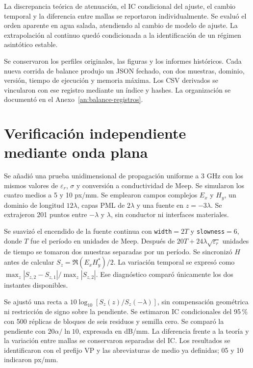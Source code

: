 La discrepancia teórica de atenuación, el IC condicional del ajuste, el cambio temporal y la diferencia entre mallas se reportaron individualmente. Se evaluó el orden aparente en agua salada, atendiendo al cambio de modelo de ajuste. La extrapolación al continuo quedó condicionada a la identificación de un régimen asintótico estable.

Se conservaron los perfiles originales, las figuras y los informes históricos. Cada nueva corrida de balance produjo un JSON fechado, con dos muestras, dominio, versión, tiempo de ejecución y memoria máxima. Los CSV derivados se vincularon con ese registro mediante un índice y hashes. La organización se documentó en el Anexo~\ref{an:balance-registros}.


\section{Verificación independiente mediante onda plana}\label{sec:metodo-planar}
Se añadió una prueba unidimensional de propagación uniforme a 3 GHz con los mismos valores de $\varepsilon_r$, $\sigma$ y conversión a conductividad de Meep. Se simularon los cuatro medios a 5 y 10 px/mm. Se emplearon campos complejos $E_x$ y $H_y$, un dominio de longitud $12\lambda$, capas PML de $2\lambda$ y una fuente en $z=-3\lambda$. Se extrajeron 201 puntos entre $-\lambda$ y $\lambda$, sin conductor ni interfaces materiales.

Se suavizó el encendido de la fuente continua con \texttt{width}$=2T$ y \texttt{slowness}$=6$, donde $T$ fue el período en unidades de Meep. Después de $20T+24\lambda\sqrt{\varepsilon_r}$ unidades de tiempo se tomaron dos muestras separadas por un período. Se sincronizó $H$ antes de calcular $S_z=\Re(E_xH_y^*)/2$. La variación temporal se expresó como $\max_z|S_{z,2}-S_{z,1}|/\max_z|S_{z,2}|$. Ese diagnóstico comparó únicamente los dos instantes disponibles.

Se ajustó una recta a $10\log_{10}[S_z(z)/S_z(-\lambda)]$, sin compensación geométrica ni restricción de signo sobre la pendiente. Se estimaron IC condicionales del 95\,\% con 500 réplicas de bloques de seis residuos y semilla cero. Se comparó la pendiente con $20\alpha/\ln 10$, expresada en dB/mm. La diferencia frente a la teoría y la variación entre mallas se conservaron separadas del IC. Los resultados se identificaron con el prefijo VP y las abreviaturas de medio ya definidas; 05 y 10 indicaron px/mm.
